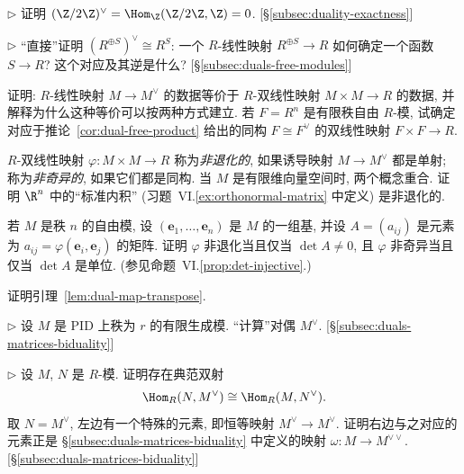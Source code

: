 \begin{prob}\label{ex:dual-z2}
$\triangleright$ 证明 $(\Z/2\Z)^\vee=\Hom_\Z(\Z/2\Z,\Z)=0$. [\S\ref{subsec:duality-exactness}]
\end{prob}

\begin{prob}\label{ex:dual-free-direct}
$\triangleright$ ``直接''证明 $(R^{\oplus S})^\vee\cong R^S$: 一个 $R$-线性映射 $R^{\oplus S}\to R$ 如何确定一个函数 $S\to R$? 这个对应及其逆是什么? [\S\ref{subsec:duals-free-modules}]
\end{prob}

\begin{prob}\label{ex:bilinear-duality}
证明: $R$-线性映射 $M\to M^\vee$ 的数据等价于 $R$-双线性映射 $M\times M\to R$ 的数据, 并解释为什么这种等价可以按两种方式建立. 若 $F=R^n$ 是有限秩自由 $R$-模, 试确定对应于推论~\ref{cor:dual-free-product} 给出的同构 $F\cong F^\vee$ 的双线性映射 $F\times F\to R$.
\end{prob}

\begin{prob}\label{ex:nondegenerate-bilinear}
$R$-双线性映射 $\varphi:M\times M\to R$ 称为\emph{非退化的}, 如果诱导映射 $M\to M^\vee$ 都是单射; 称为\emph{非奇异的}, 如果它们都是同构. 当 $M$ 是有限维向量空间时, 两个概念重合. 证明 $\R^n$ 中的``标准内积'' (习题~VI.\ref{ex:orthonormal-matrix} 中定义) 是非退化的.

若 $M$ 是秩 $n$ 的自由模, 设 $(\mathbf{e}_1,\dots,\mathbf{e}_n)$ 是 $M$ 的一组基, 并设 $A=(a_{ij})$ 是元素为 $a_{ij}=\varphi(\mathbf{e}_i,\mathbf{e}_j)$ 的矩阵. 证明 $\varphi$ 非退化当且仅当 $\det A\neq 0$, 且 $\varphi$ 非奇异当且仅当 $\det A$ 是单位. (参见命题~VI.\ref{prop:det-injective}.)
\end{prob}

\begin{prob}\label{ex:dual-map-transpose-proof}
证明引理~\ref{lem:dual-map-transpose}.
\end{prob}

\begin{prob}\label{ex:dual-pid-fg}
$\triangleright$ 设 $M$ 是 PID 上秩为 $r$ 的有限生成模. ``计算''对偶 $M^\vee$. [\S\ref{subsec:duals-matrices-biduality}]
\end{prob}

\begin{prob}\label{ex:hom-canonical-bijection}
$\triangleright$ 设 $M$, $N$ 是 $R$-模. 证明存在典范双射
\[
\Hom_R(N,M^\vee)\cong\Hom_R(M,N^\vee).
\]
取 $N=M^\vee$, 左边有一个特殊的元素, 即恒等映射 $M^\vee\to M^\vee$. 证明右边与之对应的元素正是 \S\ref{subsec:duals-matrices-biduality} 中定义的映射 $\omega:M\to M^{\vee\vee}$. [\S\ref{subsec:duals-matrices-biduality}]
\end{prob}

